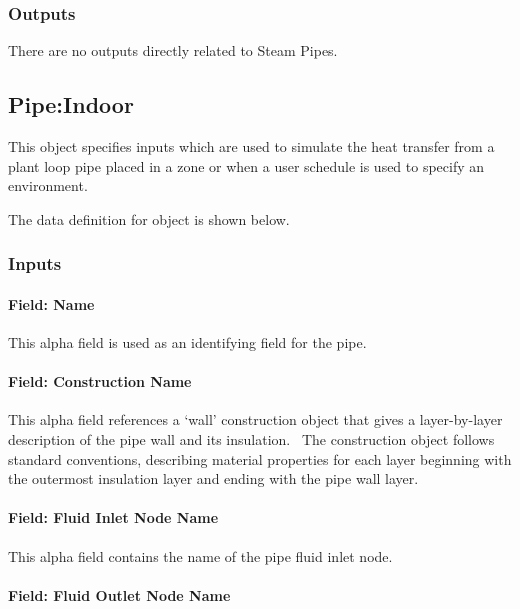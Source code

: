 \subsubsection{Outputs}\label{outputs-5-005}

There are no outputs directly related to Steam Pipes.

\subsection{Pipe:Indoor}\label{pipeindoor}

This object specifies inputs which are used to simulate the heat transfer from a plant loop pipe placed in a zone or when a user schedule is used to specify an environment.

The data definition for object is shown below.

\subsubsection{Inputs}\label{inputs-6-014}

\paragraph{Field: Name}\label{field-name-6-011}

This alpha field is used as an identifying field for the pipe.

\paragraph{Field: Construction Name}\label{field-construction-name-002}

This alpha field references a `wall' construction object that gives a layer-by-layer description of the pipe wall and its insulation.~ The construction object follows standard conventions, describing material properties for each layer beginning with the outermost insulation layer and ending with the pipe wall layer.

\paragraph{Field: Fluid Inlet Node Name}\label{field-fluid-inlet-node-name-000}

This alpha field contains the name of the pipe fluid inlet node.

\paragraph{Field: Fluid Outlet Node Name}\label{field-fluid-outlet-node-name-000}

